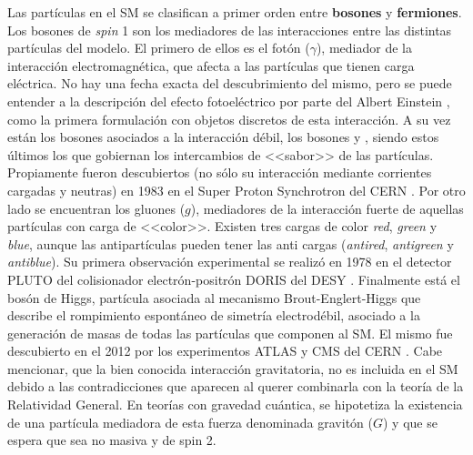 Las partículas en el SM se clasifican a primer orden entre \textbf{bosones} y \textbf{fermiones}. Los bosones de \textit{spin} 1 son los mediadores de las interacciones entre las distintas partículas del modelo. El primero de ellos es el fotón ($\gamma$), mediador de la interacción electromagnética, que afecta a las partículas que tienen carga eléctrica. No hay una fecha exacta del descubrimiento del mismo, pero se puede entender a la descripción del efecto fotoeléctrico por parte del Albert Einstein \cite{einstein}, como la primera formulación con objetos discretos de esta interacción. A su vez están los bosones asociados a la interacción débil, los bosones \Zzero y \Wpm, siendo estos últimos los que gobiernan los intercambios de <<sabor>> de las partículas. Propiamente fueron descubiertos (no sólo su interacción mediante corrientes cargadas y neutras) en 1983 en el Super Proton Synchrotron del CERN \cite{DiLella:2015yit}. Por otro lado se encuentran los gluones ($g$), mediadores de la interacción fuerte de aquellas partículas con carga de <<color>>. Existen tres cargas de color \textit{red}, \textit{green} y \textit{blue}, aunque las antipartículas pueden tener las anti cargas (\textit{antired}, \textit{antigreen} y \textit{antiblue}). Su primera observación experimental se realizó en 1978 en el detector PLUTO del colisionador electrón-positrón DORIS del DESY \cite{gluon}. Finalmente está el bosón de Higgs, partícula asociada al mecanismo Brout-Englert-Higgs que describe el rompimiento espontáneo de simetría electrodébil, asociado a la generación de masas de todas las partículas que componen al SM. El mismo fue descubierto en el 2012 por los experimentos ATLAS y CMS del CERN \cite{HIGG-2012-27, CMS-HIG-12-028}. Cabe mencionar, que la bien conocida interacción gravitatoria, no es incluida en el SM debido a las contradicciones que aparecen al querer combinarla con la teoría de la Relatividad General. En teorías con gravedad cuántica, se hipotetiza la existencia de una partícula mediadora de esta fuerza denominada gravitón ($G$) y que se espera que sea no masiva y de spin 2.

